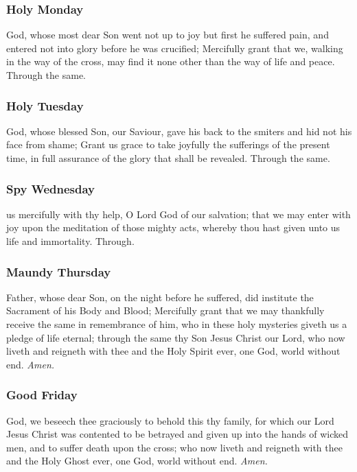 	\subsubsection{Holy Monday}
	 God, whose most dear Son went not up to joy but first he suffered pain, and entered not into glory before he was crucified; Mercifully grant that we, walking in the way of the cross, may find it none other than the way of life and peace. Through the same.
	
	\subsubsection{Holy Tuesday}
	 God, whose blessed Son, our Saviour, gave his back to the smiters and hid not his face from shame; Grant us grace to take joyfully the sufferings of the present time, in full assurance of the glory that shall be revealed. Through the same.
	
	\subsubsection{Spy Wednesday}
     us mercifully with thy help, O Lord God of our salvation; that we may enter with joy upon the meditation of those mighty acts, whereby thou hast given unto us life and immortality. Through.
	
    \subsubsection{Maundy Thursday}
     Father, whose dear Son, on the night before he suffered, did institute the Sacrament of his Body and Blood; Mercifully grant that we may thankfully receive the same in remembrance of him, who in these holy mysteries giveth us a pledge of life eternal; through the same thy Son Jesus Christ our Lord, who now liveth and reigneth with thee and the Holy Spirit ever, one God, world without end. \textit{Amen.}
	
    \subsubsection{Good Friday}
    
     God, we beseech thee graciously to behold this thy family, for which our Lord Jesus Christ was contented to be betrayed and given up into the hands of wicked men, and to suffer death upon the cross; who now liveth and reigneth with thee and the Holy Ghost ever, one God, world without end. \textit{Amen.}
    
